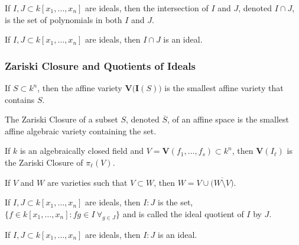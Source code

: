\documentclass[crop=false,class=article,oneside]{standalone}
\begin{document}
            \begin{definition}
                If $I,J\subset k[x_1,\hdots ,x_n]$ are ideals,
                then the intersection of $I$ and $J$,
                denoted $I\cap J$, is the set of polynomials
                in both $I$ and $J$.
            \end{definition}
            \begin{theorem}
                If $I,J\subset k[x_1,\hdots ,x_n]$ are ideals,
                then $I\cap J$ is an ideal.
            \end{theorem}
        \subsubsection{Zariski Closure and Quotients of Ideals}
            \begin{theorem}
                    If $S\subset k^n$, then the affine variety
                    $\mathbf{V}\big(\textbf{I}(S)\big)$ is
                    the smallest affine variety that contains $S$.
            \end{theorem}
            \begin{definition}
                The Zariski Closure of a subset $S$,
                denoted $\overline{S}$, of an affine space
                is the smallest affine algebraic variety
                containing the set. 
            \end{definition}
            \begin{theorem}
                If $k$ is an algebraically closed field
                and $V=\mathbf{V}(f_1,\hdots, f_s)\subset k^n$,
                then $\mathbf{V}(I_{\ell})$ is the Zariski Closure
                of $\pi_{\ell}(V)$.
            \end{theorem}
            \begin{theorem}
                If $V$ and $W$ are varieties such that
                $V\subset W$,
                then $W=V\cup \overline{\big(W\setminus V\big)}$.
            \end{theorem}
            \begin{definition}
                If $I,J\subset k[x_1,\hdots ,x_n]$ are ideals,
                then $I:J$ is the set,
                $\{f\in k[x_1,\hdots ,x_n]: fg \in I\ \forall_{g\in J}\}$
                and is called the ideal quotient of $I$ by $J$.
            \end{definition}
            \begin{theorem}
                If $I,J\subset k[x_1,\hdots ,x_n]$ are ideals,
                then $I:J$ is an ideal.
            \end{theorem}
\end{document}
